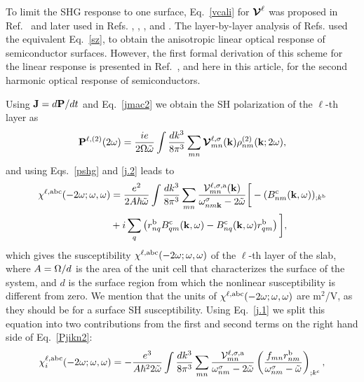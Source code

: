 \documentclass[floatfix,prb,aps,superscriptaddress,11pt,preprint,letterpaper]{revtex4}
\def\chon{black}
\begin{document}
To limit the SHG response to one surface, Eq.~\eqref{vcali} 
for $\boldsymbol{\mathcal{\cal V}}^\ell$ was proposed in 
Ref.~ and later used in Refs.
,
,
,
 and . 
The layer-by-layer analysis of Refs.  
used the equivalent Eq.~\eqref{sz}, 
to obtain the
anisotropic linear optical response of semiconductor surfaces.
However, the first formal derivation
of this scheme 
for the linear response 
is presented in
Ref.~, 
and here in this 
article, for the second harmonic optical response of semiconductors.

Using
$\mathbf{J}=d\mathbf{P}/dt$ 
and Eq.~\eqref{jmac2} 
we obtain the SH polarization of the $\ell$-th layer as
\begin{equation}\label{Pjikn}
\mathbf{P}^{\ell,(2)}(2\omega)
=\frac{ie}{2\Omega\tilde\omega}
\int \frac{dk^3}{8\pi^3}
\sum_{mn}
\boldsymbol{\mathcal{\cal V}}^{\ell,\sigma}_{mn}(\mathbf{k})
\rho^{(2)}_{nm}(\mathbf{k};2\omega)
,
\end{equation}
and using Eqs.~\eqref{pshg} and \eqref{j.2} 
leads to
\begin{align}\label{Pjikn2}
\chi^{\ell,\mathrm{a}\mathrm{b}\mathrm{c}}(-2\omega;\omega,\omega) 
&=
\frac{e^2}{2A\hbar\tilde\omega}
\int \frac{dk^3}{8\pi^3}
\sum_{mn}
\frac{{\mathbf{\cal V}}^{\ell,\sigma,\mathrm{a}}_{mn}(\mathbf{k})}
{\omega^\sigma_{nm\mathbf{k}}-2\tilde\omega}
\bigg[
-(B_{nm}^{\mathrm{c}}(\mathbf{k},\omega))_{;k^{\mathrm{b}}}
\nonumber \\
&
+i\sum_q\left(r_{nq}^{\mathrm{b}}B_{qm}^{\mathrm{c}}(\mathbf{k},\omega) -
  B_{nq}^{\mathrm{c}}(\mathbf{k},\omega) 
  r_{qm}^{\mathrm{b}}\right)
\bigg]
,
\end{align}
which gives the susceptibility 
$\chi^{\ell,\mathrm{a}\mathrm{b}\mathrm{c}}(-2\omega;\omega,\omega)$ 
of the $\ell$-th layer of the slab, 
where $A=\Omega/d$ is the area of the unit
cell that characterizes the surface of the system, and $d$
is the surface region {\color{\chon} from} which the {\color{\chon} nonlinear} 
susceptibility is different from zero.
We mention that the units of 
$\chi^{\ell,\mathrm{a}\mathrm{b}\mathrm{c}}(-2\omega;\omega,\omega)$
are m$^2$/V, as they {\color{\chon} should be} for a surface SH susceptibility.
Using Eq.~\eqref{j.1} we
split this equation into
two contributions from the first and second terms on the right hand side
{\color{\chon} of Eq.~\eqref{Pjikn2}:}
\begin{equation}\label{chii}
\chi^{\ell,\mathrm{a}\mathrm{b}\mathrm{c}}_i (-2\omega;\omega,\omega)
=-\frac{e^3}{A\hbar^22\tilde\omega}
\int \frac{dk^3}{8\pi^3}
\sum_{mn}
\frac{{\mathbf{\cal V}}_{mn}^{\ell,\sigma,\mathrm{a}}}{\omega^\sigma_{nm}-2\tilde\omega}
\left(\frac{f_{mn}r_{nm}^{\mathrm{b}}}{\omega^\sigma_{nm}-\tilde\omega}\right)_{;k^{\mathrm{c}}}
,
\end{equation} 
\end{document}
